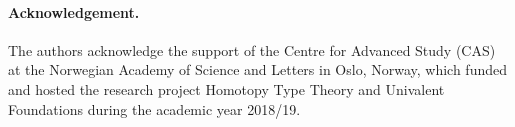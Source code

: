 \documentclass[11pt,a4paper]{article}
\theoremstyle{definition}
\begin{document}
\paragraph{Acknowledgement.}
The authors acknowledge the support of the Centre for Advanced Study (CAS)
at the Norwegian Academy of Science and Letters
in Oslo, Norway, which funded and hosted the research project Homotopy
Type Theory and Univalent Foundations during the academic year 2018/19.


\end{document}
